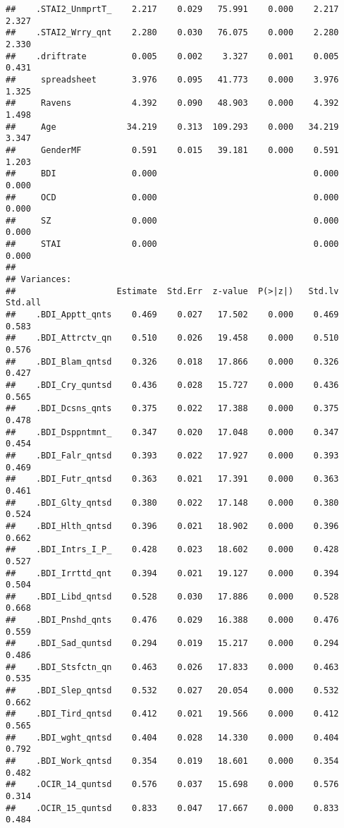 \documentclass[]{article}
\begin{document}
\begin{verbatim}
##    .STAI2_UnmprtT_    2.217    0.029   75.991    0.000    2.217    2.327
##    .STAI2_Wrry_qnt    2.280    0.030   76.075    0.000    2.280    2.330
##    .driftrate         0.005    0.002    3.327    0.001    0.005    0.431
##     spreadsheet       3.976    0.095   41.773    0.000    3.976    1.325
##     Ravens            4.392    0.090   48.903    0.000    4.392    1.498
##     Age              34.219    0.313  109.293    0.000   34.219    3.347
##     GenderMF          0.591    0.015   39.181    0.000    0.591    1.203
##     BDI               0.000                               0.000    0.000
##     OCD               0.000                               0.000    0.000
##     SZ                0.000                               0.000    0.000
##     STAI              0.000                               0.000    0.000
## 
## Variances:
##                    Estimate  Std.Err  z-value  P(>|z|)   Std.lv  Std.all
##    .BDI_Apptt_qnts    0.469    0.027   17.502    0.000    0.469    0.583
##    .BDI_Attrctv_qn    0.510    0.026   19.458    0.000    0.510    0.576
##    .BDI_Blam_qntsd    0.326    0.018   17.866    0.000    0.326    0.427
##    .BDI_Cry_quntsd    0.436    0.028   15.727    0.000    0.436    0.565
##    .BDI_Dcsns_qnts    0.375    0.022   17.388    0.000    0.375    0.478
##    .BDI_Dsppntmnt_    0.347    0.020   17.048    0.000    0.347    0.454
##    .BDI_Falr_qntsd    0.393    0.022   17.927    0.000    0.393    0.469
##    .BDI_Futr_qntsd    0.363    0.021   17.391    0.000    0.363    0.461
##    .BDI_Glty_qntsd    0.380    0.022   17.148    0.000    0.380    0.524
##    .BDI_Hlth_qntsd    0.396    0.021   18.902    0.000    0.396    0.662
##    .BDI_Intrs_I_P_    0.428    0.023   18.602    0.000    0.428    0.527
##    .BDI_Irrttd_qnt    0.394    0.021   19.127    0.000    0.394    0.504
##    .BDI_Libd_qntsd    0.528    0.030   17.886    0.000    0.528    0.668
##    .BDI_Pnshd_qnts    0.476    0.029   16.388    0.000    0.476    0.559
##    .BDI_Sad_quntsd    0.294    0.019   15.217    0.000    0.294    0.486
##    .BDI_Stsfctn_qn    0.463    0.026   17.833    0.000    0.463    0.535
##    .BDI_Slep_qntsd    0.532    0.027   20.054    0.000    0.532    0.662
##    .BDI_Tird_qntsd    0.412    0.021   19.566    0.000    0.412    0.565
##    .BDI_wght_qntsd    0.404    0.028   14.330    0.000    0.404    0.792
##    .BDI_Work_qntsd    0.354    0.019   18.601    0.000    0.354    0.482
##    .OCIR_14_quntsd    0.576    0.037   15.698    0.000    0.576    0.314
##    .OCIR_15_quntsd    0.833    0.047   17.667    0.000    0.833    0.484

\end{verbatim}
\end{document}
